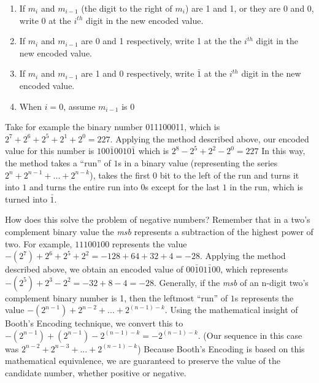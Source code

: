 \documentclass{article}
\begin{document}
\begin{enumerate}
\item If $m_i$ and $m_{i-1}$ (the digit to the right of $m_i$) are 1 and 1, or they are 0 and 0, write 0 at the $i^{th}$ digit in the new encoded value.
\item If $m_i$ and $m_{i-1}$ are 0 and 1 respectively, write 1 at the the $i^{th}$ digit in the new encoded value.
\item If $m_i$ and $m_{i-1}$ are 1 and 0 respectively, write $\bar{1}$ at the $i^{th}$ digit in the new encoded value.
\item When $i = 0$, assume $m_{i-1}$ is 0
\end{enumerate}

Take for example the binary number 011100011, which is $2^7 + 2^6 + 2^5 + 2^1 + 2^0 = 227$.
Applying the method described above, our encoded value for this number is $100\bar{1}0010\bar{1}$ which is $2^8 - 2^5 + 2^2 - 2^0 = 227$
In this way, the method takes a ``run'' of $1$s in a binary value (representing the series $2^{n} + 2^{n-1} + ...
+ 2^{n-k}$), takes the first 0 bit to the left of the run and turns it into $1$ and turns the entire run into $0$s except for the last $1$ in the run, which is turned into $\bar{1}$.

How does this solve the problem of negative numbers?
Remember that in a two's complement binary value the \emph{msb} represents a subtraction of the highest power of two.
For example, $11100100$ represents the value $-(2^{7}) + 2^{6} + 2^{5} + 2^{2} = -128 + 64 + 32 + 4 = -28$.
Applying the method described above, we obtain an encoded value of $00\bar{1}01\bar{1}00$, which represents $-(2^{5}) + 2^{3} - 2^{2} = -32 + 8 - 4 = -28$.
Generally, if the \emph{msb} of an n-digit two's complement binary number is 1, then the leftmost ``run'' of $1$s represents the value $-(2^{n-1}) + 2^{n-2} + ...
+ 2^{(n-1)-k}$.
Using the mathematical insight of Booth's Encoding technique, we convert this to $-(2^{n-1}) + (2^{n-1}) - 2^{(n-1)-k} = -2^{(n-1)-k}$.
(Our sequence in this case was $2^{n-2} + 2^{n-3} + ...
+ 2^{(n-1)-k}$)
Because Booth's Encoding is based on this mathematical equivalence, we are guaranteed to preserve the value of the candidate number, whether positive or negative.
 
\end{document}
